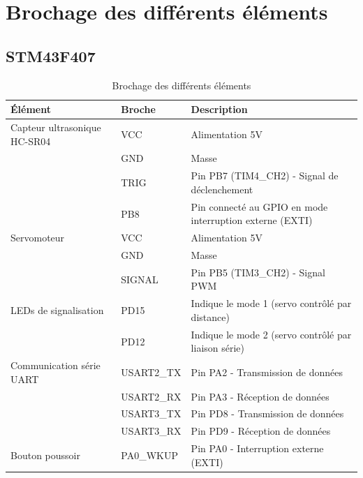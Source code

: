 \section{Brochage des différents éléments}
\subsection{STM43F407}

\begin{table}[H]
\centering
\begin{tabular}{|l|l|l|}
\hline
\textbf{Élément}                  & \textbf{Broche}         & \textbf{Description} \\ \hline
Capteur ultrasonique HC-SR04      & VCC                     & Alimentation 5V \\ \hline
                                  & GND                     & Masse \\ \hline
                                  & TRIG                    & Pin PB7 (TIM4\_CH2) - Signal de déclenchement \\ \hline
                                  & PB8                     & Pin connecté au GPIO en mode interruption externe (EXTI) \\ \hline
Servomoteur                       & VCC                     & Alimentation 5V \\ \hline
                                  & GND                     & Masse \\ \hline
                                  & SIGNAL                  & Pin PB5 (TIM3\_CH2) - Signal PWM \\ \hline
LEDs de signalisation             & PD15                    & Indique le mode 1 (servo contrôlé par distance) \\ \hline
                                  & PD12                    & Indique le mode 2 (servo contrôlé par liaison série) \\ \hline
Communication série UART          & USART2\_TX              & Pin PA2 - Transmission de données \\ \hline
                                  & USART2\_RX              & Pin PA3 - Réception de données \\ \hline
                                  & USART3\_TX              & Pin PD8 - Transmission de données \\ \hline
                                  & USART3\_RX              & Pin PD9 - Réception de données \\ \hline
Bouton poussoir                   & PA0\_WKUP               & Pin PA0 - Interruption externe (EXTI) \\ \hline
\end{tabular}
\caption{Brochage des différents éléments}
\label{tab:brochage_stm}
\end{table}

